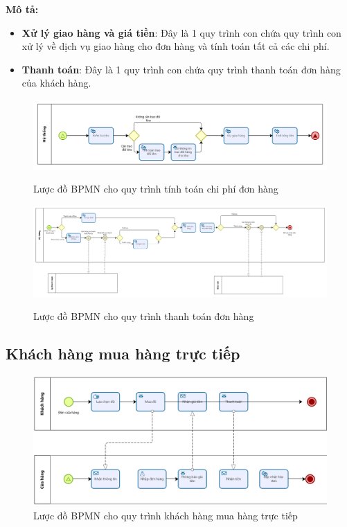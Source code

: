     \newpage
    \textbf{Mô tả:}
    \begin{itemize}
        \item \textbf{Xử lý giao hàng và giá tiền}: Đây là 1 quy trình con chứa quy trình con xử lý về dịch vụ giao hàng cho đơn hàng và tính toán tất cả các chi phí.
        \item \textbf{Thanh toán}: Đây là 1 quy trình con chứa quy trình thanh toán đơn hàng của khách hàng.
    \end{itemize}
    \begin{figure}[!htp]
        \centering
        \includegraphics[width=5in]{img/BPMN/customer_buy/customer_calc_fee.png}
        \label{4}
        \newline
        \caption{Lược đồ BPMN cho quy trình tính toán chi phí đơn hàng}
    \end{figure}
    \begin{figure}[!htp]
        \centering
        \includegraphics[width=17cm]{img/BPMN/customer_buy/customer_payment.png}
        \label{4}
        \newline
        \caption{Lược đồ BPMN cho quy trình thanh toán đơn hàng}
    \end{figure}

\subsection{Khách hàng mua hàng trực tiếp}
\begin{figure}[!htp]
    \centering
    \includegraphics[width=14cm]{img/BPMN/Hien/Customer_buyOffline.png}
    \newline
    \caption{Lược đồ BPMN cho quy trình khách hàng mua hàng trực tiếp}
\end{figure}

